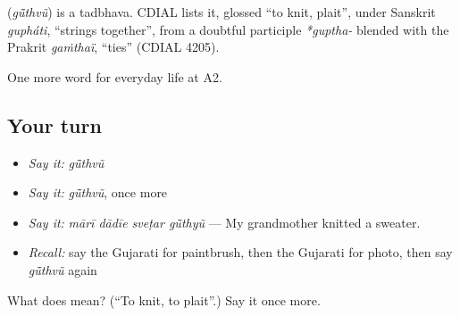 \begin{cousinweb}
\textbf{} (\emph{gū̃thvũ}) is a tadbhava. CDIAL lists it, glossed \textquotedblleft{}to knit, plait\textquotedblright{}, under Sanskrit \emph{gupháti}, \textquotedblleft{}strings together\textquotedblright{}, from a doubtful participle \emph{*guptha-} blended with the Prakrit \emph{gaṁthaï}, \textquotedblleft{}ties\textquotedblright{} (CDIAL 4205).
\end{cousinweb}

\begin{grammarlens}[title={What you've built}]
One more word for everyday life at A2.
\end{grammarlens}

\subsection*{Your turn}
\begin{itemize}
\raggedright
  \item \emph{Say it:} \emph{gū̃thvũ}
  \item \emph{Say it:} \emph{gū̃thvũ}, once more
  \item \emph{Say it:} \emph{mārī dādīe sveṭar gū̃thyũ} — My grandmother knitted a sweater.
  \item \emph{Recall:} say the Gujarati for paintbrush, then the Gujarati for photo, then say \emph{gū̃thvũ} again
\end{itemize}

\begin{tcolorbox}[breakable,colback=teal!4,colframe=teal!35!black,title={Before you move on}]
What does  mean? (\textquotedblleft{}To knit, to plait\textquotedblright{}.) Say it once more.
\end{tcolorbox}
